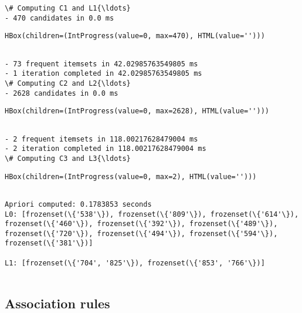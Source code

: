 \documentclass[11pt]{article}
\begin{document}
    \begin{Verbatim}[commandchars=\\\{\}]
\# Computing C1 and L1{\ldots}
- 470 candidates in 0.0 ms

    \end{Verbatim}

    
    \begin{verbatim}
HBox(children=(IntProgress(value=0, max=470), HTML(value='')))
    \end{verbatim}

    
    \begin{Verbatim}[commandchars=\\\{\}]

- 73 frequent itemsets in 42.02985763549805 ms
- 1 iteration completed in 42.02985763549805 ms
\# Computing C2 and L2{\ldots}
- 2628 candidates in 0.0 ms

    \end{Verbatim}

    
    \begin{verbatim}
HBox(children=(IntProgress(value=0, max=2628), HTML(value='')))
    \end{verbatim}

    
    \begin{Verbatim}[commandchars=\\\{\}]

- 2 frequent itemsets in 118.00217628479004 ms
- 2 iteration completed in 118.00217628479004 ms
\# Computing C3 and L3{\ldots}

    \end{Verbatim}

    
    \begin{verbatim}
HBox(children=(IntProgress(value=0, max=2), HTML(value='')))
    \end{verbatim}

    
    \begin{Verbatim}[commandchars=\\\{\}]

Apriori computed: 0.1783853 seconds
L0: [frozenset(\{'538'\}), frozenset(\{'809'\}), frozenset(\{'614'\}), frozenset(\{'460'\}), frozenset(\{'392'\}), frozenset(\{'489'\}), frozenset(\{'720'\}), frozenset(\{'494'\}), frozenset(\{'594'\}), frozenset(\{'381'\})]

L1: [frozenset(\{'704', '825'\}), frozenset(\{'853', '766'\})]


    \end{Verbatim}

    \hypertarget{association-rules}{%
\subsection{Association rules}\label{association-rules}}
\end{document}
